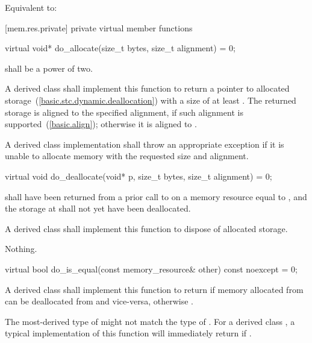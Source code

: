 \begin{itemdescr}
\pnum
\effects
Equivalent to: 
\end{itemdescr}


[mem.res.private]{ private virtual member functions}

%
\begin{itemdecl}
virtual void* do_allocate(size_t bytes, size_t alignment) = 0;
\end{itemdecl}

\begin{itemdescr}
\pnum
\requires
{} shall be a power of two.

\pnum
\returns
A derived class shall implement this function to return a pointer to allocated storage~(\ref{basic.stc.dynamic.deallocation}) with a size of at least .
The returned storage is aligned to the specified alignment, if such alignment is supported~(\ref{basic.align});
otherwise it is aligned to .

\pnum
\throws
A derived class implementation shall throw an appropriate exception if it is unable to allocate memory with the requested size and alignment.
\end{itemdescr}

%
\begin{itemdecl}
virtual void do_deallocate(void* p, size_t bytes, size_t alignment) = 0;
\end{itemdecl}

\begin{itemdescr}
\pnum
\requires
{} shall have been returned from a prior call to  on a memory resource equal to ,
and the storage at  shall not yet have been deallocated.

\pnum
\effects
A derived class shall implement this function to dispose of allocated storage.

\pnum
\throws
Nothing.
\end{itemdescr}

%
\begin{itemdecl}
virtual bool do_is_equal(const memory_resource& other) const noexcept = 0;
\end{itemdecl}

\begin{itemdescr}
\pnum
\returns
A derived class shall implement this function to return  if memory allocated from  can be deallocated from  and vice-versa,
otherwise .
\begin{note}
The most-derived type of  might not match the type of .
For a derived class , a typical implementation of this function
will immediately return 
if .\end{note}
\end{itemdescr}

